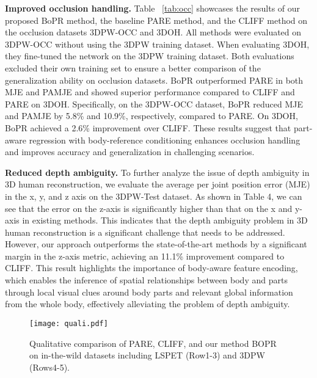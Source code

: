 \documentclass[10pt,twocolumn,letterpaper]{article}
\begin{document}
\noindent\textbf{Improved occlusion handling.}
Table ~\ref{tab:occ} showcases the results of our proposed BoPR method, the baseline PARE method, and the CLIFF method on the occlusion datasets 3DPW-OCC and 3DOH. All methods were evaluated on 3DPW-OCC without using the 3DPW training dataset. When evaluating 3DOH, they fine-tuned the network on the 3DPW training dataset. Both evaluations excluded their own training set to ensure a better comparison of the generalization ability on occlusion datasets. BoPR outperformed PARE in both MJE and PAMJE and showed superior performance compared to CLIFF and PARE on 3DOH. Specifically, on the 3DPW-OCC dataset, BoPR reduced MJE and PAMJE by 5.8\% and 10.9\%, respectively, compared to PARE. On 3DOH, BoPR achieved a 2.6\% improvement over CLIFF. These results suggest that part-aware regression with body-reference conditioning enhances occlusion handling and improves accuracy and generalization in challenging scenarios.



\noindent\textbf{Reduced depth ambiguity.}
To further analyze the issue of depth ambiguity in 3D human reconstruction, we evaluate the average per joint position error (MJE) in the x, y, and z axis on the 3DPW-Test dataset. As shown in Table 4, we can see that the error on the z-axis is significantly higher than that on the x and y-axis in existing methods. This indicates that the depth ambiguity problem in 3D human reconstruction is a significant challenge that needs to be addressed. However, our approach outperforms the state-of-the-art methods by a significant margin in the z-axis metric, achieving an 11.1\% improvement compared to CLIFF. This result highlights the importance of body-aware feature encoding, which enables the inference of spatial relationships between body and parts through local visual clues around body parts and relevant global information from the whole body, effectively alleviating the problem of depth ambiguity.


\begin{figure*}
  \centering
  \texttt{[image: quali.pdf]}
  \vspace{-1em}
  \caption{Qualitative comparison of PARE, CLIFF, and our method BOPR on in-the-wild datasets including LSPET (Row1-3) and 3DPW (Rows4-5).}\label{fig:qua}
\end{figure*}
\end{document}
